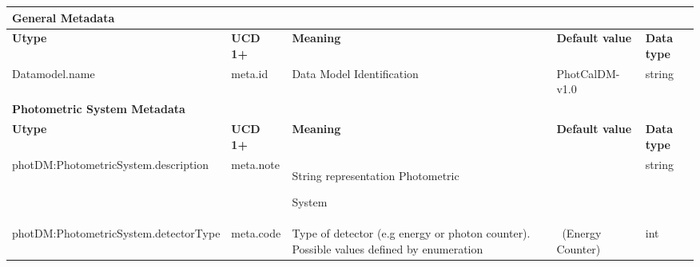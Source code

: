 \documentclass[11pt,a4paper]{ivoa}
\begin{document}
\begin{appendices}
\begin{table}[H]
 			\centering
 			\begin{adjustbox}{angle=90}
\begin{tabular}{p{5in}p{0.87in}p{0.91in}p{0.74in}p{0.35in}}
\multicolumn{5}{p{\dimexpr6.59in+8\tabcolsep\relax}}{\centering 
{\fontsize{10pt}{12.0pt}\selectfont \textbf{General Metadata}}} \\
\hline
\multicolumn{1}{p{5in}}{{\fontsize{10pt}{12.0pt}\selectfont \textbf{Utype}}} &
\multicolumn{1}{p{0.87in}}{{\fontsize{10pt}{12.0pt}\selectfont \textbf{UCD 1+}}} &
\multicolumn{1}{p{0.91in}}{{\fontsize{10pt}{12.0pt}\selectfont \textbf{Meaning}}} &
\multicolumn{1}{p{0.74in}}{{\fontsize{10pt}{12.0pt}\selectfont \textbf{Default value}}} &
\multicolumn{1}{p{0.35in}}{{\fontsize{10pt}{12.0pt}\selectfont \textbf{Data type}}} \\
\hline
\multicolumn{1}{p{5in}}{{\fontsize{10pt}{12.0pt}\selectfont Datamodel.name}} &
\multicolumn{1}{p{0.87in}}{{\fontsize{10pt}{12.0pt}\selectfont meta.id }} &
\multicolumn{1}{p{0.91in}}{{\fontsize{10pt}{12.0pt}\selectfont Data Model Identification }} &
\multicolumn{1}{p{0.74in}}{{\fontsize{10pt}{12.0pt}\selectfont PhotCalDM-v1.0}} &
\multicolumn{1}{p{0.35in}}{{\fontsize{10pt}{12.0pt}\selectfont string}} \\
\hline
\multicolumn{5}{p{\dimexpr6.59in+8\tabcolsep\relax}}{\centering 
{\fontsize{10pt}{12.0pt}\selectfont \textbf{Photometric System Metadata}}} \\
\hline
\multicolumn{1}{p{5in}}{{\fontsize{10pt}{12.0pt}\selectfont \textbf{Utype}}} &
\multicolumn{1}{p{0.87in}}{{\fontsize{10pt}{12.0pt}\selectfont \textbf{UCD 1+}}} &
\multicolumn{1}{p{0.91in}}{{\fontsize{10pt}{12.0pt}\selectfont \textbf{Meaning}}} &
\multicolumn{1}{p{0.74in}}{{\fontsize{10pt}{12.0pt}\selectfont \textbf{Default value}}} &
\multicolumn{1}{p{0.35in}}{{\fontsize{10pt}{12.0pt}\selectfont \textbf{Data type}}} \\
\hline
\multicolumn{1}{p{5in}}{{\fontsize{10pt}{12.0pt}\selectfont photDM:PhotometricSystem.description}} &
\multicolumn{1}{p{0.87in}}{{\fontsize{10pt}{12.0pt}\selectfont meta.note }} &
\multicolumn{1}{p{0.91in}}{{\fontsize{10pt}{12.0pt}\selectfont String representation Photometric } 
\par {\fontsize{10pt}{12.0pt}\selectfont System}} &
\multicolumn{1}{p{0.74in}}{} &
\multicolumn{1}{p{0.35in}}{{\fontsize{10pt}{12.0pt}\selectfont string}} \\
\hline
\multicolumn{1}{p{5in}}{{\fontsize{10pt}{12.0pt}\selectfont photDM:PhotometricSystem.detectorType}} &
\multicolumn{1}{p{0.87in}}{{\fontsize{10pt}{12.0pt}\selectfont meta.code }} &
\multicolumn{1}{p{0.91in}}{{\fontsize{10pt}{12.0pt}\selectfont Type of detector 
(e.g energy or photon counter). Possible values defined by enumeration}} &
\multicolumn{1}{p{0.74in}}{{\fontsize{10pt}{12.0pt}\selectfont 0\  (Energy Counter)}} &
\multicolumn{1}{p{0.35in}}{{\fontsize{10pt}{12.0pt}\selectfont int}} \\
\hline
\end{tabular}
\end{adjustbox}
 \end{table}


\end{appendices}
\end{document}
